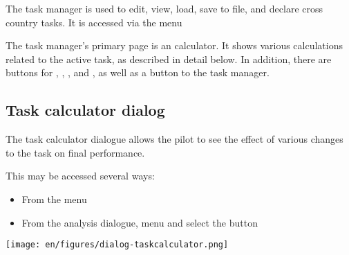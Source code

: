 The task manager is used to edit, view, load, save to file, and declare cross
country tasks. It is accessed via the menu
\begin{quote}
\blink{}
\end{quote} 

The task manager's primary page is an calculator. It shows various calculations 
related to the active task, as described in detail below.  In addition, there 
are buttons for , , , 
and , as well as a button to  the task manager.

\subsection*{Task calculator dialog}\label{sec:task-calc-dial}
The task calculator dialogue allows the pilot to see the effect of
various changes to the task on final performance.

This may be accessed several ways: 
\begin{itemize}
\item From the menu 
\begin{quote}
\blink{}
\end{quote}
\item From the analysis dialogue, menu \blink{} and select
 the button 
\end{itemize}

\begin{center}
\texttt{[image: en/figures/dialog-taskcalculator.png]}
\end{center}

